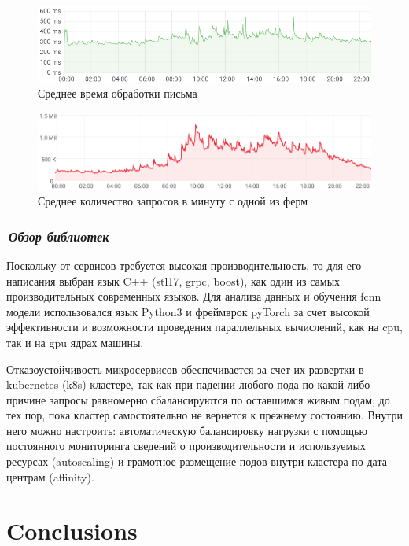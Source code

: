 \documentclass[12pt]{article}
\begin{document}
\begin{figure}[h!]
	\center
	\includegraphics[scale=0.6]{timings.png}
	\caption{Среднее время обработки письма}
	\label{fig:03}
\end{figure}


\begin{figure}[h!]
	\center
	\includegraphics[scale=0.5]{processed_messages.png}
	\caption{Среднее количество запросов в минуту с одной из ферм}
	\label{fig:04}
\end{figure}

\subsubsection*{\it\,Обзор библиотек}

Поскольку от сервисов требуется высокая производительность, то для его написания выбран язык C++ (stl17, grpc, boost), как один из самых производительных современных языков. Для анализа данных и обучения fcnn модели использовался язык Python3 и фреймврок pyTorch за счет высокой эффективности и возможности проведения параллельных вычислений, как на cpu, так и на gpu ядрах машины.

Отказоустойчивость микросервисов обеспечивается за счет их развертки в kubernetes (k8s) кластере, так как при падении любого пода по какой-либо причине запросы равномерно сбалансируются по оставшимся живым подам, до тех пор, пока кластер самостоятельно не вернется к прежнему состоянию. Внутри него можно настроить: автоматическую балансировку нагрузки с помощью постоянного мониторинга сведений о производительности и используемых ресурсах (autoscaling) и грамотное размещение подов внутри кластера по дата центрам (affinity).


\section{Conclusions}
\end{document}
